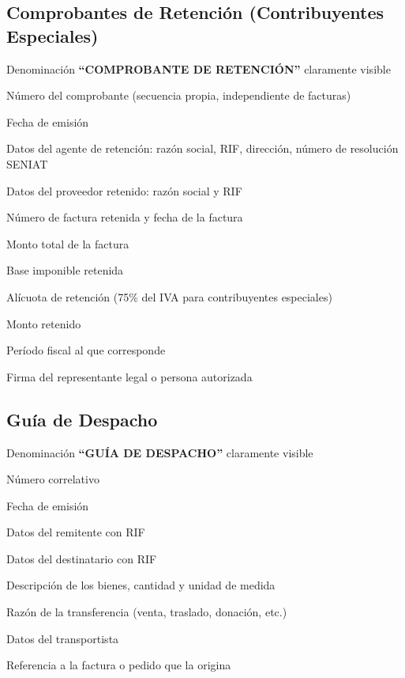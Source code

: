 \documentclass[11pt,a4paper]{article}
\begin{document}
\begin{Form}
\subsection{Comprobantes de Retención (Contribuyentes Especiales)}

\begin{checklist}
  \item Denominación \textbf{``COMPROBANTE DE RETENCIÓN''} claramente visible
  \item Número del comprobante (secuencia propia, independiente de facturas)
  \item Fecha de emisión
  \item Datos del agente de retención: razón social, RIF, dirección, número de resolución SENIAT
  \item Datos del proveedor retenido: razón social y RIF
  \item Número de factura retenida y fecha de la factura
  \item Monto total de la factura
  \item Base imponible retenida
  \item Alícuota de retención (75\% del IVA para contribuyentes especiales)
  \item Monto retenido
  \item Período fiscal al que corresponde
  \item Firma del representante legal o persona autorizada
\end{checklist}

\subsection{Guía de Despacho}

\begin{checklist}
  \item Denominación \textbf{``GUÍA DE DESPACHO''} claramente visible
  \item Número correlativo
  \item Fecha de emisión
  \item Datos del remitente con RIF
  \item Datos del destinatario con RIF
  \item Descripción de los bienes, cantidad y unidad de medida
  \item Razón de la transferencia (venta, traslado, donación, etc.)
  \item Datos del transportista
  \item Referencia a la factura o pedido que la origina
\end{checklist}


\end{Form}
\end{document}
